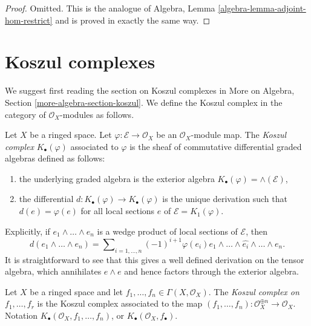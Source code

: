 \begin{proof}
Omitted. This is the analogue of
Algebra, Lemma \ref{algebra-lemma-adjoint-hom-restrict}
and is proved in exactly the same way.
\end{proof}





\section{Koszul complexes}
\label{section-koszul-complex}

\noindent
We suggest first reading the section on Koszul complexes in
More on Algebra, Section \ref{more-algebra-section-koszul}.
We define the Koszul complex in the category of $\mathcal{O}_X$-modules
as follows.

\begin{definition}
\label{definition-koszul}
Let $X$ be a ringed space. Let $\varphi : \mathcal{E} \to \mathcal{O}_X$
be an $\mathcal{O}_X$-module map. The
{\it Koszul complex} $K_\bullet(\varphi)$ associated to $\varphi$
is the sheaf of commutative differential graded algebras defined as follows:
\begin{enumerate}
\item the underlying graded algebra is the exterior algebra
$K_\bullet(\varphi) = \wedge(\mathcal{E})$,
\item the differential $d : K_\bullet(\varphi) \to K_\bullet(\varphi)$
is the unique derivation such that $d(e) = \varphi(e)$ for all
local sections $e$ of $\mathcal{E} = K_1(\varphi)$.
\end{enumerate}
\end{definition}

\noindent
Explicitly, if $e_1 \wedge \ldots \wedge e_n$ is a wedge product of local
sections of $\mathcal{E}$, then
$$
d(e_1 \wedge \ldots \wedge e_n) =
\sum\nolimits_{i = 1, \ldots, n} (-1)^{i + 1}
\varphi(e_i)e_1 \wedge \ldots \wedge \widehat{e_i} \wedge \ldots \wedge e_n.
$$
It is straightforward to see that this gives a well defined derivation
on the tensor algebra, which annihilates $e \wedge e$ and hence factors
through the exterior algebra.

\begin{definition}
\label{definition-koszul-complex}
Let $X$ be a ringed space and let
$f_1, \ldots, f_n \in \Gamma(X, \mathcal{O}_X)$. The
{\it Koszul complex on $f_1, \ldots, f_r$} is the Koszul complex
associated to the map
$(f_1, \ldots, f_n) : \mathcal{O}_X^{\oplus n} \to \mathcal{O}_X$.
Notation $K_\bullet(\mathcal{O}_X, f_1, \ldots, f_n)$,
or $K_\bullet(\mathcal{O}_X, f_\bullet)$.
\end{definition}

